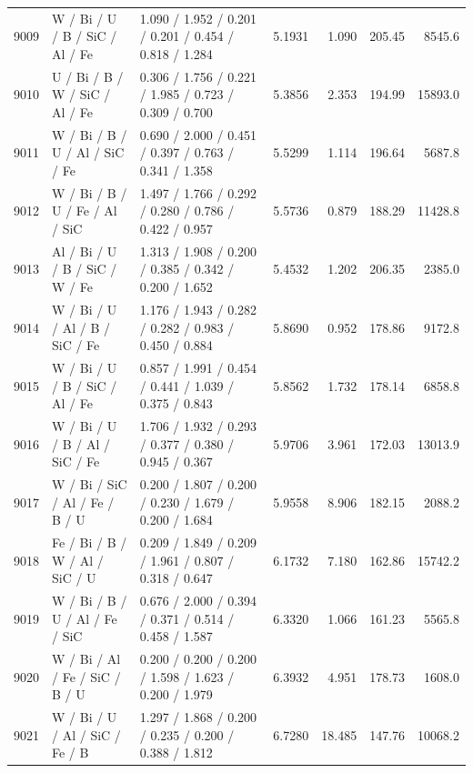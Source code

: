 \begin{landscape}
\begin{longtable}{rllrrrr}
9009 & W / Bi / U / B / SiC / Al / Fe & 1.090 / 1.952 / 0.201 / 0.201 / 0.454 / 0.818 / 1.284 & 5.1931 & 1.090 & 205.45 & 8545.6\\

9010 & U / Bi / B / W / SiC / Al / Fe & 0.306 / 1.756 / 0.221 / 1.985 / 0.723 / 0.309 / 0.700 & 5.3856 & 2.353 & 194.99 & 15893.0\\

9011 & W / Bi / B / U / Al / SiC / Fe & 0.690 / 2.000 / 0.451 / 0.397 / 0.763 / 0.341 / 1.358 & 5.5299 & 1.114 & 196.64 & 5687.8\\

9012 & W / Bi / B / U / Fe / Al / SiC & 1.497 / 1.766 / 0.292 / 0.280 / 0.786 / 0.422 / 0.957 & 5.5736 & 0.879 & 188.29 & 11428.8\\

9013 & Al / Bi / U / B / SiC / W / Fe & 1.313 / 1.908 / 0.200 / 0.385 / 0.342 / 0.200 / 1.652 & 5.4532 & 1.202 & 206.35 & 2385.0\\

9014 & W / Bi / U / Al / B / SiC / Fe & 1.176 / 1.943 / 0.282 / 0.282 / 0.983 / 0.450 / 0.884 & 5.8690 & 0.952 & 178.86 & 9172.8\\

9015 & W / Bi / U / B / SiC / Al / Fe & 0.857 / 1.991 / 0.454 / 0.441 / 1.039 / 0.375 / 0.843 & 5.8562 & 1.732 & 178.14 & 6858.8\\

9016 & W / Bi / U / B / Al / SiC / Fe & 1.706 / 1.932 / 0.293 / 0.377 / 0.380 / 0.945 / 0.367 & 5.9706 & 3.961 & 172.03 & 13013.9\\

9017 & W / Bi / SiC / Al / Fe / B / U & 0.200 / 1.807 / 0.200 / 0.230 / 1.679 / 0.200 / 1.684 & 5.9558 & 8.906 & 182.15 & 2088.2\\

9018 & Fe / Bi / B / W / Al / SiC / U & 0.209 / 1.849 / 0.209 / 1.961 / 0.807 / 0.318 / 0.647 & 6.1732 & 7.180 & 162.86 & 15742.2\\

9019 & W / Bi / B / U / Al / Fe / SiC & 0.676 / 2.000 / 0.394 / 0.371 / 0.514 / 0.458 / 1.587 & 6.3320 & 1.066 & 161.23 & 5565.8\\

9020 & W / Bi / Al / Fe / SiC / B / U & 0.200 / 0.200 / 0.200 / 1.598 / 1.623 / 0.200 / 1.979 & 6.3932 & 4.951 & 178.73 & 1608.0\\

9021 & W / Bi / U / Al / SiC / Fe / B & 1.297 / 1.868 / 0.200 / 0.235 / 0.200 / 0.388 / 1.812 & 6.7280 & 18.485 & 147.76 & 10068.2\\


\end{longtable}
\end{landscape}

